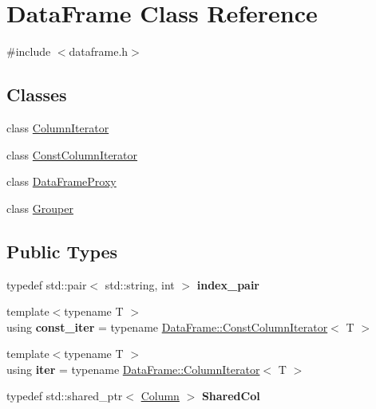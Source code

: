\hypertarget{classDataFrame}{}\section{Data\+Frame Class Reference}
\label{classDataFrame}


{\ttfamily \#include $<$dataframe.\+h$>$}

\subsection*{Classes}
\begin{DoxyCompactItemize}
\item 
class \hyperlink{classDataFrame_1_1ColumnIterator}{Column\+Iterator}
\item 
class \hyperlink{classDataFrame_1_1ConstColumnIterator}{Const\+Column\+Iterator}
\item 
class \hyperlink{classDataFrame_1_1DataFrameProxy}{Data\+Frame\+Proxy}
\item 
class \hyperlink{classDataFrame_1_1Grouper}{Grouper}
\end{DoxyCompactItemize}
\subsection*{Public Types}
\begin{DoxyCompactItemize}
\item 
\mbox{\label{classDataFrame_ad93eb4d37be97ccfb877d55492e7c466}} 
typedef std\+::pair$<$ std\+::string, int $>$ {\bfseries index\+\_\+pair}
\item 
\mbox{\label{classDataFrame_ac671e117f490645e57260a411588259b}} 
{\footnotesize template$<$typename T $>$ }\\using {\bfseries const\+\_\+iter} = typename \hyperlink{classDataFrame_1_1ConstColumnIterator}{Data\+Frame\+::\+Const\+Column\+Iterator}$<$ T $>$
\item 
\mbox{\label{classDataFrame_ae7adc59ee324161ae3717b1d27ea52f5}} 
{\footnotesize template$<$typename T $>$ }\\using {\bfseries iter} = typename \hyperlink{classDataFrame_1_1ColumnIterator}{Data\+Frame\+::\+Column\+Iterator}$<$ T $>$
\item 
\mbox{\label{classDataFrame_ab4b83782ba7a3ce010fae4f73480c26f}} 
typedef std\+::shared\+\_\+ptr$<$ \hyperlink{classColumn}{Column} $>$ {\bfseries Shared\+Col}
\end{DoxyCompactItemize}
